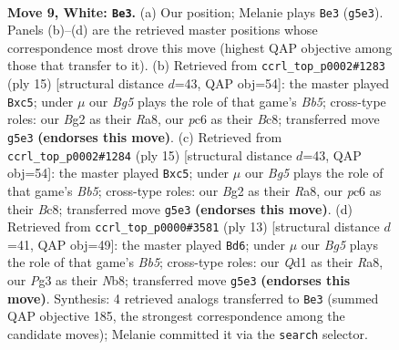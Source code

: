 \documentclass[11pt]{article}
\begin{document}
\clearpage

\begin{figure}[p]\centering
\begin{subfigure}{0.46\textwidth}\centering
\resizebox{\linewidth}{!}{%
\newchessgame
\chessboard[
  setfen={rnbqk2r/pp4p1/2pb1n2/3p1pBp/3P4/5NP1/PP2PPBP/RN1Q1RK1 w kq - 0 9},
  showmover=false,
  pgfstyle=straightmove, color=movearrow, markmove={g5-e3}
]}
\caption{}
\end{subfigure}\hfill
\begin{subfigure}{0.46\textwidth}\centering
\resizebox{\linewidth}{!}{%
\newchessgame
\chessboard[
  setfen={rnbq1rk1/pp3ppp/5n2/2Pp4/1b6/2NBPN2/PP3PPP/R1BQK2R b KQ - 0 8},
  showmover=false,
  pgfstyle=straightmove, color=movearrow, markmove={b4-c5}
]}
\caption{}
\end{subfigure}
\\[4pt]
\begin{subfigure}{0.46\textwidth}\centering
\resizebox{\linewidth}{!}{%
\newchessgame
\chessboard[
  setfen={rnbq1rk1/pp3ppp/5n2/2Pp4/1b6/2NBPN2/PP3PPP/R1BQK2R b KQ - 0 8},
  showmover=false,
  pgfstyle=straightmove, color=movearrow, markmove={b4-c5}
]}
\caption{}
\end{subfigure}\hfill
\begin{subfigure}{0.46\textwidth}\centering
\resizebox{\linewidth}{!}{%
\newchessgame
\chessboard[
  setfen={rnbq1rk1/ppp2ppp/5n2/3p4/1b1P4/2NBPN2/PP3PPP/R1BQK2R b KQ - 3 7},
  showmover=false,
  pgfstyle=straightmove, color=movearrow, markmove={b4-d6}
]}
\caption{}
\end{subfigure}
\caption{\textbf{Move 9, White: \texttt{Be3}.} (a) Our position; Melanie plays \texttt{Be3} (\texttt{g5e3}). Panels (b)--(d) are the retrieved master positions whose correspondence most drove this move (highest QAP objective among those that transfer to it). (b) Retrieved from \texttt{ccrl\_top\_p0002\#1283} (ply 15) [structural distance $d$=43, QAP obj=54]: the master played \texttt{Bxc5}; under $\mu$ our \emph{Bg5} plays the role of that game's \emph{Bb5}; cross-type roles: our \emph{B}g2 as their \emph{R}a8, our \emph{p}c6 as their \emph{B}c8; transferred move \texttt{g5e3} \textbf{(endorses this move)}. (c) Retrieved from \texttt{ccrl\_top\_p0002\#1284} (ply 15) [structural distance $d$=43, QAP obj=54]: the master played \texttt{Bxc5}; under $\mu$ our \emph{Bg5} plays the role of that game's \emph{Bb5}; cross-type roles: our \emph{B}g2 as their \emph{R}a8, our \emph{p}c6 as their \emph{B}c8; transferred move \texttt{g5e3} \textbf{(endorses this move)}. (d) Retrieved from \texttt{ccrl\_top\_p0000\#3581} (ply 13) [structural distance $d$=41, QAP obj=49]: the master played \texttt{Bd6}; under $\mu$ our \emph{Bg5} plays the role of that game's \emph{Bb5}; cross-type roles: our \emph{Q}d1 as their \emph{R}a8, our \emph{P}g3 as their \emph{N}b8; transferred move \texttt{g5e3} \textbf{(endorses this move)}. Synthesis: 4 retrieved analogs transferred to \texttt{Be3} (summed QAP objective 185, the strongest correspondence among the candidate moves); Melanie committed it via the \texttt{search} selector.}
\label{fig:thought-m16}
\end{figure}
\end{document}
